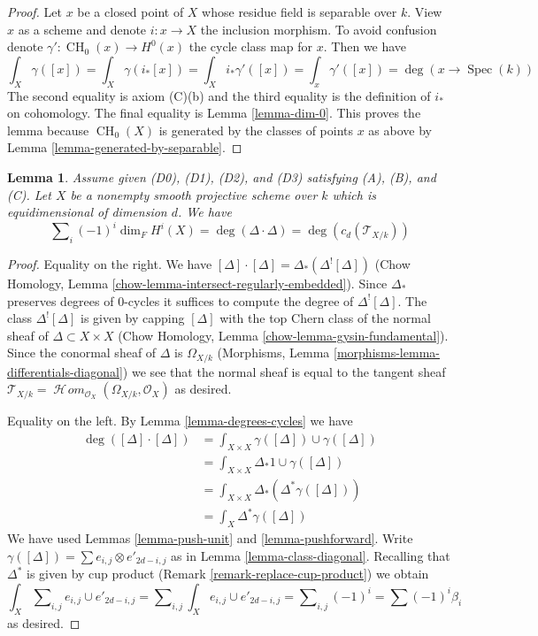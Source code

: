 \documentclass{stacks-project}
\theoremstyle{plain}
\newtheorem{lemma}[subsection]{Lemma}
\theoremstyle{definition}
\theoremstyle{remark}
\numberwithin{equation}{subsection}
\def\Spec{\mathop{\mathrm{Spec}}}
\def\SheafHom{\mathop{\mathcal{H}\!\mathit{om}}\nolimits}
\def\CH{\mathop{\mathrm{CH}}\nolimits}
\begin{document}
\begin{proof}
Let $x$ be a closed point of $X$ whose residue field is separable
over $k$. View $x$ as a scheme and denote $i : x \to X$ the inclusion morphism.
To avoid confusion denote $\gamma' : \CH_0(x) \to H^0(x)$ the cycle class map
for $x$. Then we have
$$
\int_X \gamma([x]) = \int_X \gamma(i_*[x]) =
\int_X i_*\gamma'([x]) = \int_x \gamma'([x]) = \deg(x \to \Spec(k))
$$
The second equality is axiom (C)(b) and the third equality is
the definition of $i_*$ on cohomology. The final equality is
Lemma \ref{lemma-dim-0}. This proves the lemma
because $\CH_0(X)$ is generated by the classes of points $x$ as above
by Lemma \ref{lemma-generated-by-separable}.
\end{proof}

\begin{lemma}
\label{lemma-square-diagonal}
Assume given (D0), (D1), (D2), and (D3) satisfying (A), (B), and (C).
Let $X$ be a nonempty smooth projective scheme over $k$ which is
equidimensional of dimension $d$. We have
$$
\sum\nolimits_i (-1)^i\dim_F H^i(X) =
\deg(\Delta \cdot \Delta) = \deg(c_d(\mathcal{T}_{X/k}))
$$
\end{lemma}

\begin{proof}
Equality on the right. We have
$[\Delta] \cdot [\Delta] = \Delta_*(\Delta^![\Delta])$
(Chow Homology, Lemma \ref{chow-lemma-intersect-regularly-embedded}).
Since $\Delta_*$ preserves degrees of $0$-cycles it suffices to compute
the degree of $\Delta^![\Delta]$. The class $\Delta^![\Delta]$ is given
by capping $[\Delta]$ with
the top Chern class of the normal sheaf of $\Delta \subset X \times X$
(Chow Homology, Lemma \ref{chow-lemma-gysin-fundamental}).
Since the conormal sheaf of $\Delta$ is $\Omega_{X/k}$
(Morphisms, Lemma \ref{morphisms-lemma-differentials-diagonal})
we see that the normal sheaf is equal to the tangent sheaf
$\mathcal{T}_{X/k} = \SheafHom_{\mathcal{O}_X}(\Omega_{X/k}, \mathcal{O}_X)$
as desired.

\medskip\noindent
Equality on the left. By Lemma \ref{lemma-degrees-cycles} we have
\begin{align*}
\deg([\Delta] \cdot [\Delta])
& =
\int_{X \times X} \gamma([\Delta]) \cup \gamma([\Delta]) \\
& =
\int_{X \times X} \Delta_*1 \cup \gamma([\Delta]) \\
& =
\int_{X \times X} \Delta_*(\Delta^*\gamma([\Delta])) \\
& =
\int_X \Delta^*\gamma([\Delta])
\end{align*}
We have used Lemmas \ref{lemma-push-unit} and
\ref{lemma-pushforward}.
Write $\gamma([\Delta]) = \sum  e_{i, j} \otimes e'_{2d - i , j}$
as in Lemma \ref{lemma-class-diagonal}.
Recalling that $\Delta^*$ is given by cup product
(Remark \ref{remark-replace-cup-product}) we obtain
$$
\int_X \sum\nolimits_{i, j} e_{i, j} \cup e'_{2d - i, j} =
\sum\nolimits_{i, j} \int_X e_{i, j} \cup e'_{2d - i, j} =
\sum\nolimits_{i, j} (-1)^i = \sum (-1)^i\beta_i
$$
as desired.
\end{proof}
\end{document}
